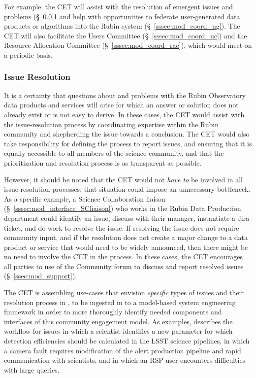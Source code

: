 \documentclass[DM,lsstdraft,toc]{lsstdoc}
\begin{document}
For example, the CET will assist with the resolution of emergent issues and problems (\S~\ref{sssec:mod_coord_res} and help with opportunities to federate user-generated data products or algorithms into the Rubin system (\S~\ref{sssec:mod_coord_ug}).
The CET will also facilitate the Users Committee (\S~\ref{sssec:mod_coord_uc}) and the Resource Allocation Committee (\S~\ref{sssec:mod_coord_rac}), which would meet on a periodic basis.


\subsubsection{Issue Resolution}\label{sssec:mod_coord_res}

It is a certainty that questions about and problems with the Rubin Observatory data products and services will arise for which an answer or solution does not already exist or is not easy to derive. 
In these cases, the CET would assist with the issue-resolution process by coordinating expertise within the Rubin community and shepherding the issue towards a conclusion.
The CET would also take responsibility for defining the process to report issues, and ensuring that it is equally accessible to all members of the science community, and that the prioritization and resolution process is as transparent as possible.

However, it should be noted that the CET would not \textit{have to} be involved in all issue resolution processes; that situation could impose an unnecessary bottleneck.
As a specific example, a Science Collaboration liaison (\S~\ref{sssec:mod_interface_SCliaison}) who works in the Rubin Data Production department could identify an issue, discuss with their manager, instantiate a Jira ticket, and do work to resolve the issue.
If resolving the issue does not require community input, and if the resolution does not create a major change to a data product or service that would need to be widely announced, then there might be no need to involve the CET in the process.
In these cases, the CET encourages all parties to use of the Community forum to discuss and report resolved issues (\S~\ref{ssec:mod_support}).

The CET is assembling use-cases that envision \textit{specific} types of issues and their resolution process in , to be ingested in to a model-based system engineering framework in order to more thoroughly identify needed components and interfaces of this community engagement model.
As examples,  describes the workflow for issues in which a scientist identifies a new parameter for which detection efficiencies should be calculated in the LSST science pipelines, in which a camera fault requires modification of the alert production pipeline and rapid communication with scientists, and in which an RSP user encounters difficulties with large queries. 
\end{document}
